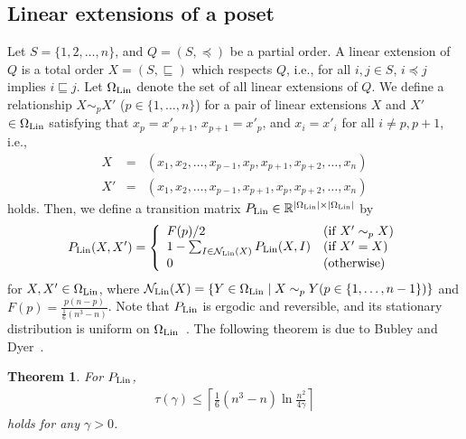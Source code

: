 \documentclass[letter, 11pt]{article}
\newcommand{\1}{\mbox{1}\hspace{-0.25em}\mbox{l}}
\newtheorem{theorem}{Theorem}[section]
\begin{document}
\subsection{Linear extensions of a poset}\label{sec:linear_extensions}
Let $S=\{1, 2, \ldots, n\}$, and $Q=(S, \preceq )$ be a partial order. 
A linear extension of $Q$ is a total order $X=(S, \sqsubseteq )$ which respects $Q$, 
i.e., for all $i, j\in S$, $i\preceq j$ implies $i\sqsubseteq j$. 
Let $\Omega_{\rm Lin}$ denote the set of all linear extensions of $Q$. 
We define a relationship $X \sim_p X'$ ($p \in \{1,\ldots, n\}$) 
  for a pair of linear extensions $X$ and $X'$ $\in \Omega_{\rm Lin}$ 
  satisfying that $x_p=x'_{p+1}$, $x_{p+1}=x'_p$, and $x_i=x'_i$ for all $i\neq p, p+1$, 
 i.e., 
\begin{eqnarray*}
X&=&(x_1, x_2, \ldots, x_{p-1}, x_p, x_{p+1}, x_{p+2}, \ldots , x_n) \\
X'&=&(x_1, x_2, \ldots, x_{p-1}, x_{p+1}, x_p, x_{p+2}, \ldots , x_n)
\end{eqnarray*}
holds. Then, we define a transition matrix $P_{\rm Lin} \in \mathbb{R}^{|\Omega_{\rm Lin}| \times |\Omega_{\rm Lin}|}$ by
\begin{align}
\label{eq:linearP}
P_{\rm Lin}(X, X') = \left\{
\begin{array}{ll}
F(p)/2 & (\mbox{if } X'\sim_p X)\\
1-\sum_{I\in {\cal N}_{\rm Lin}(X)}P_{\rm Lin}(X, I)& (\mbox{if } X'=X)\\
0 & (\mbox{otherwise})
\end{array}
\right. 
\end{align}
for $X, X'\in \Omega_{\rm Lin}$, where ${\cal N}_{\rm Lin}(X)=\{Y\in \Omega_{\rm Lin}\mid X\sim_p Y(p\in \{1, \ldots, n-1\})\}$ and $F(p)=\frac{p(n-p)}{\frac{1}{6}(n^3-n)}$. 
Note that $P_{\rm Lin}$ is ergodic and reversible, and 
 its stationary distribution is uniform on $\Omega_{\rm Lin}$~\cite{BD99}. 
The following theorem is due to Bubley and Dyer~\cite{BD99}. 
\begin{theorem}
\label{thm:linearmix}
\cite{BD99}
For $P_{\rm Lin}$, \begin{eqnarray*}
\tau(\gamma)\leq \left \lceil \frac{1}{6}(n^3-n) \ln \frac{n^2}{4\gamma } \right \rceil \end{eqnarray*}
holds for any $\gamma>0$. 
\end{theorem}
\end{document}
